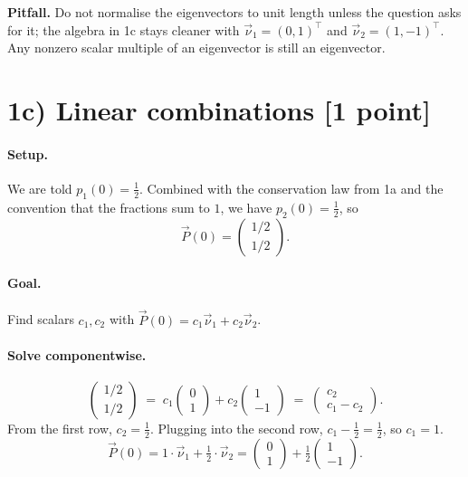 \documentclass[12pt,a4paper]{article}
\newcommand{\vnu}{\vec{\nu}}
\newcommand{\vP}{\vec{P}}
\begin{document}
\begin{warn}
\textbf{Pitfall.} Do not normalise the eigenvectors to unit length unless the question asks for it; the algebra in 1c stays cleaner with $\vnu_1 = (0,1)^{\top}$ and $\vnu_2 = (1,-1)^{\top}$. Any nonzero scalar multiple of an eigenvector is still an eigenvector.
\end{warn}

\section*{1c) Linear combinations [1 point]}

\paragraph{Setup.} We are told $p_1(0) = \tfrac{1}{2}$. Combined with the conservation law from 1a and the convention that the fractions sum to $1$, we have $p_2(0) = \tfrac{1}{2}$, so
\[
\vP(0) = \begin{pmatrix} 1/2 \\ 1/2 \end{pmatrix}.
\]

\paragraph{Goal.} Find scalars $c_1, c_2$ with $\vP(0) = c_1\vnu_1 + c_2\vnu_2$.

\paragraph{Solve componentwise.}
\[
\begin{pmatrix} 1/2 \\ 1/2 \end{pmatrix} \;=\; c_1\begin{pmatrix} 0\\1\end{pmatrix} + c_2\begin{pmatrix} 1\\-1\end{pmatrix} \;=\; \begin{pmatrix} c_2\\ c_1 - c_2 \end{pmatrix}.
\]
From the first row, $c_2 = \tfrac{1}{2}$. Plugging into the second row, $c_1 - \tfrac{1}{2} = \tfrac{1}{2}$, so $c_1 = 1$.
\[
\boxed{\vP(0) = 1\cdot\vnu_1 + \tfrac{1}{2}\cdot\vnu_2 = \begin{pmatrix} 0\\1\end{pmatrix} + \tfrac{1}{2}\begin{pmatrix} 1\\-1\end{pmatrix}.}
\]
\end{document}
